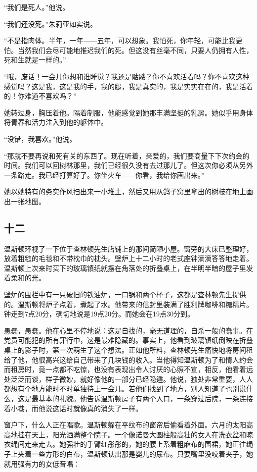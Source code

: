 ``我们是死人。''他说。

``我们还没死。''朱莉亚如实说。

``不是指肉体。半年，一年------五年，可以想象。我怕死，你年轻，可能比我更怕。当然我们会尽可能地推迟我们的死。但这没有丝毫不同，只要人仍拥有人性，死和生就是一样的。''

``哦，废话！一会儿你想和谁睡觉？我还是骷髅？你不喜欢活着吗？你不喜欢这种感觉吗？这是我，这是我的手，我的腿，我是真实的，我是实实在在的，我是活着的！你难道不喜欢吗？''

她转过身，胸压着他。隔着制服，他能感觉到她那丰满坚挺的乳房。她似乎用身体将青春和活力注入到他的躯体中。

``没错，我喜欢。''他说。

``那就不要再说和死有关的东西了。现在听着，亲爱的，我们要商量下下次约会的时间。我们可以回树林那里，我们已经很久没有去过那儿了。但这次你必须从另外一条路走。我已经打算好了。你坐火车------你看，我给你画出来。''

她以她特有的务实作风扫出来一小堆土，然后又用从鸽子窝里拿出的树枝在地上画出一张地图。

\subsection{十二}\label{ux5341ux4e8c}

温斯顿环视了一下位于查林顿先生店铺上的那间简陋小屋。窗旁的大床已整理好，放着粗糙的毛毯和不带枕巾的枕头。壁炉上十二小时的老式座钟滴滴答答地走着。温斯顿上次来时买下的玻璃镇纸就摆在角落处的折叠桌上，在半明半暗的屋子里发着柔和的光。

壁炉的围栏中有一只破旧的铁油炉，一口锅和两个杯子，这都是查林顿先生提供的。温斯顿将炉子点着，煮起了水。他带来的信封里装满了胜利牌咖啡和糖精片。钟走到7点20分，确切地说是19点20分。而她会在19点30分到。

愚蠢，愚蠢。他在心里不停地说：这是自找的，毫无道理的，自杀一般的蠢事。在党员可能犯的所有罪行中，这是最难隐藏的。事实上，他看到玻璃镇纸倒映在折叠桌上的影子时，第一次萌生了这个想法。正如他所料，查林顿先生痛快地将房间租给了他，他很高兴这给自己带来了几块钱的收入。当他得知温斯顿为了和情人约会而租房时，竟一点都不吃惊，也没有表现出令人讨厌的心照不宣，相反，他看着远处泛泛而谈，样子微妙，就好像他的一部分已经隐遁。他说，独处非常重要，人人都想有个地方能时不时单独待上一会儿。若他们找到了地方，别人知道了也别说什么，这是最基本的礼貌。他告诉温斯顿房子有两个入口，一条穿过后院，一条连接着小巷，而他说这话时就像真的消失了一样。

窗户下，什么人正在唱歌。温斯顿躲在平纹布的窗帘后偷看着外面。六月的太阳高高地挂在天上，阳光洒满整个院子。一个像诺曼大圆柱般高壮的女人在洗衣盆和晾衣绳间走来走去。她强壮的手臂红彤彤的，她的腰上系着粗麻布的围裙，她正往绳子上夹着一些方形的白布，温斯顿认出那是婴儿的尿布。只要嘴里没咬着夹子，她就用强有力的女低音唱：

